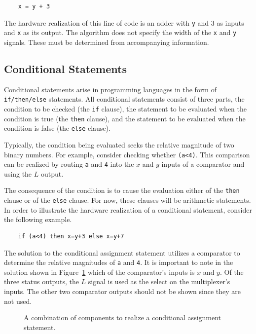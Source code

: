 \begin{verbatim}
    x = y + 3
\end{verbatim}

The hardware realization of this line of code is an adder with \verb+y+ 
and 3 as inputs and \verb+x+ as its output.  The algorithm does not
specify the width of the \verb+x+ and \verb+y+ signals. These must
be determined from accompanying information.


\subsection{Conditional Statements}
Conditional statements arise in programming languages in the
form of \verb+if/then/else+ statements.  All conditional statements consist 
of three parts, the condition to be checked (the \verb+if+ clause), the 
statement to be evaluated when the condition is true (the \verb+then+ clause), 
and the statement to be evaluated when the condition is false (the
\verb+else+ clause).

Typically, the condition being evaluated seeks the relative
magnitude of two binary numbers.  For example, consider checking whether
 \verb+(a<4)+.  This comparison can be
realized by routing \verb+a+ and \verb+4+ into the $x$ and
$y$ inputs of a comparator and using the $L$ output.

The consequence of the condition is to cause the evaluation either of
the \verb+then+ clause or of the \verb+else+ clause.  For now, these 
clauses will 
be arithmetic statements.  In order to illustrate the hardware
realization of a conditional statement, consider the following
example.

\begin{verbatim}
    if (a<4) then x=y+3 else x=y+7
\end{verbatim}

The solution to the conditional assignment statement utilizes 
a comparator to determine the relative magnitudes of \verb+a+ 
and \verb+4+.  It is important to note in the solution shown in
Figure~\ref{fig:cond} which of the 
comparator's inputs is $x$ and $y$.  Of the three status outputs, 
the $L$ signal is used as the select on the multiplexer's inputs.  The 
other two comparator outputs should not be shown since they are
not used. 


\begin{figure}[ht]
\caption{A combination of components to realize a conditional assignment
statement.}
\label{fig:cond}
\end{figure}

